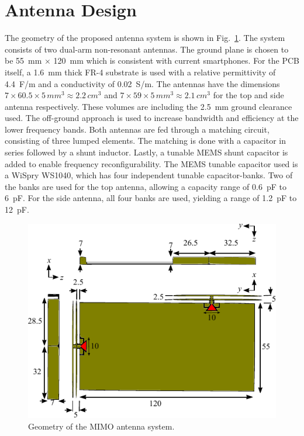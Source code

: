 \section{Antenna Design}
\label{sec:antennadesign}
The geometry of the proposed antenna system is shown in Fig.~\ref{fig:antdesign}. The system consists of two dual-arm non-resonant antennas. The ground plane is chosen to be \SI{55}{mm} $\times$ \SI{120}{mm} which is consistent with current smartphones. For the PCB itself, a \SI{1.6}{mm} thick FR-4 substrate is used with a relative permittivity of \SI{4.4}{F/m}  and a conductivity of \SI{0.02}{S/m}. The antennas have the dimensions $7 \times 60.5 \times 5\,  \si{mm^3} \approx 2.2\,  \si{cm^3} $ 
and $7 \times 59 \times 5\,  \si{mm^3} \approx 2.1\,  \si{cm^3}$  for the top and side antenna respectively. These volumes are including the \SI{2.5}{mm} ground clearance used. The off-ground approach is used to increase bandwidth and efficiency at the lower frequency bands. Both antennas are fed through a matching circuit, consisting of three lumped elements. The matching is done with a capacitor in series followed by a shunt inductor. Lastly, a tunable MEMS  shunt capacitor is added to enable frequency reconfigurability. The MEMS tunable capacitor used is a WiSpry WS1040, which has four independent tunable capacitor-banks. Two of the banks are used for the top antenna, allowing a capacity range of \SI{0.6}{pF} to \SI{6}{pF}. For the side antenna, all four banks are used, yielding a range of \SI{1.2}{pF} to \SI{12}{pF}.

\begin{figure}[t]
  \begin{center}
    \includegraphics{img/3d_drawing}
  \end{center}
  \caption{Geometry of the MIMO antenna system.}
  \label{fig:antdesign}
\end{figure}

